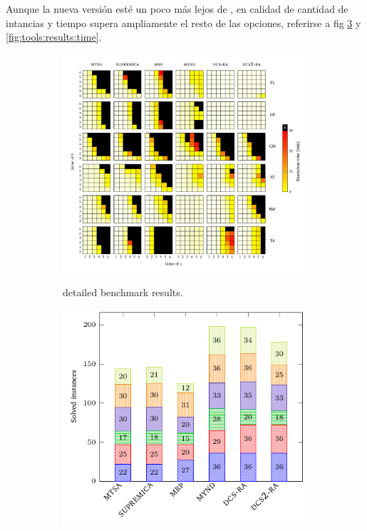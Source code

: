 Aunque la nueva versión esté un poco más lejos de \MYND, en calidad de cantidad de intancias y tiempo supera ampliamente el resto de las opciones, referirse a fig \ref{fig:tools:results:instances} y \ref{fig:tools:results:time}.
\begin{figure}[th]
    \centering
    \hspace*{-20mm}
    \begin{subfigure}{0.7\textwidth}
        \includegraphics[width=\linewidth]{figures/benchmark/tools_vs.pdf}\label{fig:tools:results:detailed}
        \caption{\DCS detailed benchmark results.}
    \end{subfigure}%
    \begin{subfigure}{0.5\textwidth}
        \includegraphics[width=0.9\linewidth]{figures/benchmark/tools_instances.pdf}\label{fig:tools:results:instances}

\end{subfigure}
\end{figure}
